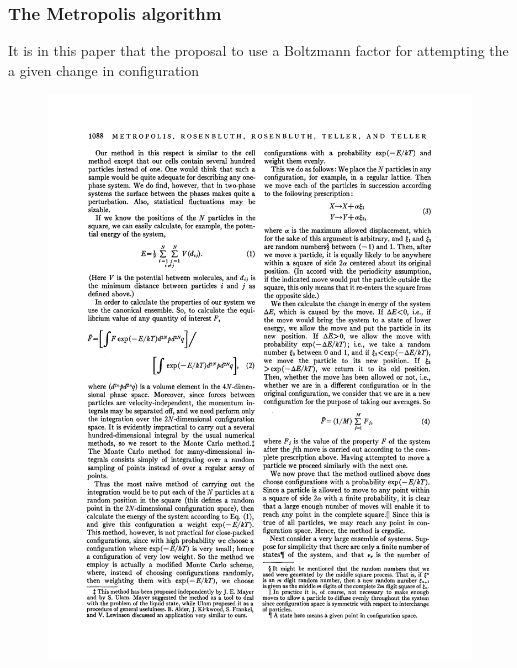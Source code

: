 \documentclass[hyperref={colorlinks=true}]{beamer}
\begin{document}
\begin{frame}%
  \frametitle{The Metropolis algorithm}
  
  It is in this paper that the proposal to use a Boltzmann factor for attempting the  a given change in configuration
  
  \begin{center}
  \begin{minipage}{0.8\columnwidth}
  \begin{framed}
  \begin{figure}
    \centering
    \includegraphics[width=\columnwidth]{MetropolisWeight1.pdf}\\

\end{figure}
\end{framed}
\end{minipage}
\end{center}
\end{frame}
\end{document}

